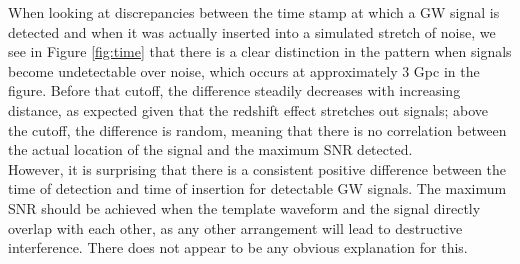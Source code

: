\documentclass{article}
\begin{document}
When looking at discrepancies between the time stamp at which a GW signal is detected and when it was actually inserted into a simulated stretch of noise, we see in Figure \ref{fig:time} that there is a clear distinction in the pattern when signals become undetectable over noise, which occurs at approximately 3 Gpc in the figure. Before that cutoff, the difference steadily decreases with increasing distance, as expected given that the redshift effect stretches out signals; above the cutoff, the difference is random, meaning that there is no correlation between the actual location of the signal and the maximum SNR detected. \\

However, it is surprising that there is a consistent positive difference between the time of detection and time of insertion for detectable GW signals. The maximum SNR should be achieved when the template waveform and the signal directly overlap with each other, as any other arrangement will lead to destructive interference. There does not appear to be any obvious explanation for this. 
\end{document}
